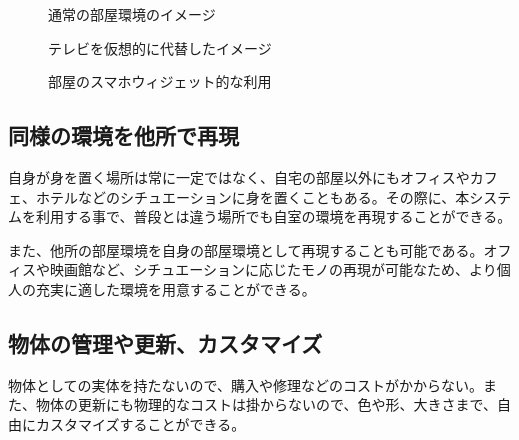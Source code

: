 \begin{figure}[htbp]
    \begin{center}
    \end{center}
    \caption{通常の部屋環境のイメージ}
    \label{fig:normal-room}
  \end{figure}

\begin{figure}[htbp]
    \begin{minipage}{0.5\hsize}
      \begin{center}
      \end{center}
      \label{fig:bigTV}
      \caption{テレビを仮想的に代替したイメージ}
    \end{minipage}
    \begin{minipage}{0.5\hsize}
      \begin{center}
      \end{center}
      \caption{部屋のスマホウィジェット的な利用}
      \label{fig:widget}
    \end{minipage}
\end{figure}

\subsection{同様の環境を他所で再現}

自身が身を置く場所は常に一定ではなく、自宅の部屋以外にもオフィスやカフェ、ホテルなどのシチュエーションに身を置くこともある。その際に、本システムを利用する事で、普段とは違う場所でも自室の環境を再現することができる。

また、他所の部屋環境を自身の部屋環境として再現することも可能である。オフィスや映画館など、シチュエーションに応じたモノの再現が可能なため、より個人の充実に適した環境を用意することができる。

\subsection{物体の管理や更新、カスタマイズ}

物体としての実体を持たないので、購入や修理などのコストがかからない。また、物体の更新にも物理的なコストは掛からないので、色や形、大きさまで、自由にカスタマイズすることができる。

